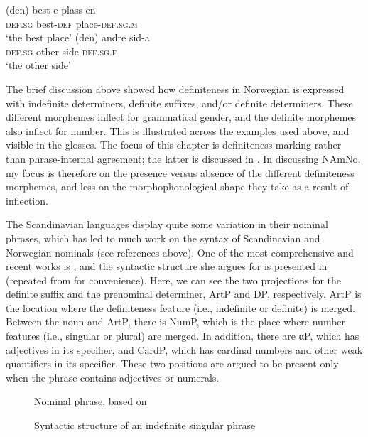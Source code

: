 \documentclass[output=paper]{langscibook}
\begin{document}
\ea  \label{ex:vanbaal:7}
\ea  \label{ex:vanbaal:7a}
\gll (den) best-e plass-en \\
    \textsc{def.sg} best-\textsc{def} place-\textsc{def.sg.m} \\
\glt `the best place' 
\ex \label{ex:vanbaal:7b}
\gll (den) andre sid-a \\
    \textsc{def.sg} other side-\textsc{def.sg.f} \\
\glt `the other side' 
\z 
\z

\begin{sloppypar}
The brief discussion above showed how definiteness in Norwegian is expressed with indefinite determiners, definite suffixes, and/or definite determiners. These different morphemes inflect for grammatical gender, and the definite morphemes also inflect for number. This is illustrated across the examples used above, and visible in the glosses. The focus of this chapter is definiteness marking rather than phrase\hyp internal agreement; the latter is discussed in . In discussing NAmNo, my focus is therefore on the presence versus absence of the different definiteness morphemes, and less on the morphophonological shape they take as a result of inflection.
\end{sloppypar}
 
The Scandinavian languages display quite some variation in their nominal phrases, which has led to much work on the syntax of Scandinavian and Norwegian nominals (see references above). One of the most comprehensive and recent works is \citet{Julien2005}, and the syntactic structure she argues for is presented in  (repeated from  for convenience). Here, we can see the two projections for the definite suffix and the prenominal determiner, ArtP and DP, respectively. ArtP is the location where the definiteness feature (i.e., indefinite or definite) is merged. Between the noun and ArtP, there is NumP, which is the place where number features (i.e., singular or plural) are merged. In addition, there are αP, which has adjectives in its specifier, and CardP, which has cardinal numbers and other weak quantifiers in its specifier. These two positions are argued to be present only when the phrase contains adjectives or numerals.


\begin{figure}
\begin{floatrow}
{\caption{Nominal phrase, based on \citet{Julien2002Determiners,Julien2005}}\label{fig:vanbaal:fromex:8}}

{\caption{Syntactic structure of an indefinite singular phrase}\label{fig:vanbaal:fromex:9}}

\end{floatrow}
\end{figure}
\end{document}
